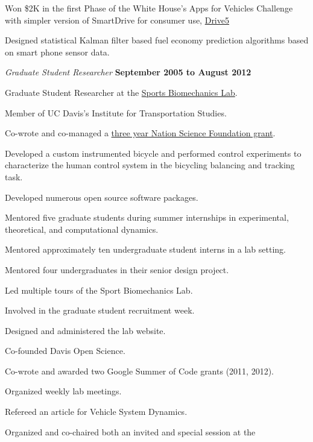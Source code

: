 \documentclass[10pt]{article}
\newenvironment{outerlist}[1][\enskip\textbullet]%
        {\begin{itemize}[#1]}{\end{itemize}%
         \vspace{-.6\baselineskip}}
\newenvironment{innerlist}[1][\enskip\textbullet]%
        {\begin{compactitem}[#1]}{\end{compactitem}}
\begin{document}
\begin{outerlist}
\begin{innerlist}
    \item Won \$2K in the first Phase of the White House's Apps for Vehicles
      Challenge with simpler version of SmartDrive for consumer use,
      \href{http://drive5.us}{Drive5}
    \item Designed statistical Kalman filter based fuel economy prediction
      algorithms based on smart phone sensor data.
  \end{innerlist}
  \item[] \textit{Graduate Student Researcher}%
        \hfill \textbf{September 2005 to August 2012}
  \begin{innerlist}
    \item Graduate Student Researcher at the
      \href{http://biosport.ucdavis.edu}{Sports Biomechanics Lab}.
    \item Member of UC Davis's Institute for Transportation Studies.
    \item Co-wrote and co-managed a
        \href{http://nsf.gov/awardsearch/showAward.do?AwardNumber=0928339}{three year
        Nation Science Foundation grant}.
    \item Developed a custom instrumented bicycle and performed control
        experiments to characterize the human control system in the bicycling
        balancing and tracking task.
    \item Developed numerous open source software packages.
    \item Mentored five graduate students during summer internships in
      experimental, theoretical, and computational dynamics.
    \item Mentored approximately ten undergraduate student interns in a lab
      setting.
    \item Mentored four undergraduates in their senior design project.
    \item Led multiple tours of the Sport Biomechanics Lab.
    \item Involved in the graduate student recruitment week.
    \item Designed and administered the lab website.
    \item Co-founded Davis Open Science.
    \item Co-wrote and awarded two Google Summer of Code grants (2011, 2012).
    \item Organized weekly lab meetings.
    \item Refereed an article for Vehicle System Dynamics.
    \item Organized and co-chaired both an invited and special session at the

\end{innerlist}
\end{outerlist}
\end{document}
